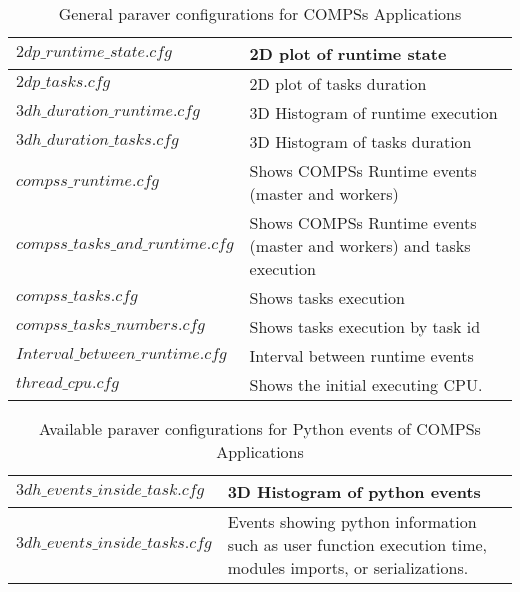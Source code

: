 \bgroup
  \def\arraystretch{1.5}
  \begin{table}[h]
    \begin{center}
      \begin{tabular}{| p{} | p{} |}
	\hline
	$2dp\_runtime\_state.cfg$		& 2D plot of runtime state \\ \hline
	$2dp\_tasks.cfg$			& 2D plot of tasks duration \\ \hline
	$3dh\_duration\_runtime.cfg$		& 3D Histogram of runtime execution \\ \hline
	$3dh\_duration\_tasks.cfg$		& 3D Histogram of tasks duration \\ \hline
	$compss\_runtime.cfg$ 			& Shows COMPSs Runtime events (master and workers) \\ \hline
	$compss\_tasks\_and\_runtime.cfg$ 	& Shows COMPSs Runtime events (master and workers) and tasks execution \\ \hline
	$compss\_tasks.cfg$ 			& Shows tasks execution \\ \hline
	$compss\_tasks\_numbers.cfg$ 		& Shows tasks execution by task id \\ \hline
	$Interval\_between\_runtime.cfg$ 	& Interval between runtime events \\ \hline
	$thread\_cpu.cfg$			& Shows the initial executing CPU. \\ \hline
      \end{tabular}
      \caption{General paraver configurations for COMPSs Applications}
      \label{tab:paraver_configs}
    \end{center}
  \end{table}
\egroup

\bgroup
  \def\arraystretch{1.5}
  \begin{table}[h]
    \begin{center}
      \begin{tabular}{| p{} | p{} |}
	\hline
	$3dh\_events\_inside\_task.cfg$		& 3D Histogram of python events \\ \hline
	$3dh\_events\_inside\_tasks.cfg$	& Events showing python information such as user function execution time, modules imports, or serializations. \\ \hline
      \end{tabular}
      \caption{Available paraver configurations for Python events of COMPSs Applications}
      \label{tab:paraver_configs}
    \end{center}
  \end{table}
\egroup


